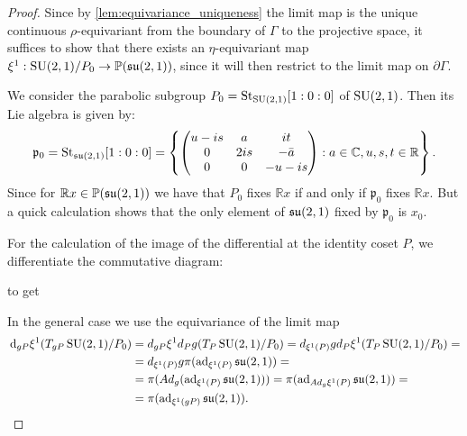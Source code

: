 \documentclass{report}
\begin{document}
\begin{proof}
Since by \cref{lem:equivariance_uniqueness} the limit map is the unique continuous $\rho$-equivariant from the boundary of $\Gamma$ to the projective space, it suffices to show that there exists an $\eta$-equivariant map $\xi^1:\operatorname{{\mathrm{SU}}}(2,1)/P_0 \to \mathbb P(\mathfrak{su}(2,1))$, since it will then restrict to the limit map on $\partial \Gamma$.

We consider the parabolic subgroup $P_0 = \mathrm{St}_{\operatorname{{\mathrm{SU}}}(2,1)} [1:0:0]$ of $\operatorname{{\mathrm{SU}}}(2,1)$.
Then its Lie algebra is given by:
\[
\mathfrak p_0 = \mathrm{St}_{\operatorname{{\mathfrak{su}}}(2,1)}[1:0:0] = \left\{ \begin{pmatrix} u - is & a & i t \\ 0 & 2is & - \bar a \\ 0 & 0 & -u - is \end{pmatrix} : a \in \mathbb C, u,s,t \in \mathbb R \right\}.
\]
Since for $\mathbb R x \in \mathbb P(\operatorname{{\mathfrak{su}}}(2,1))$ we have that $P_0$ fixes $\mathbb R x$ if and only if $\mathfrak p_0$ fixes $\mathbb R x$.
But a quick calculation shows that the only element of $\operatorname{{\mathfrak{su}}}(2,1)$ fixed by $\mathfrak p_0$ is $x_0$.

For the calculation of the image of the differential at the identity coset $P$, we differentiate the commutative diagram:

to get

In the general case we use the equivariance of the limit map
\begin{align*}
    \,\mathrm{d}_{gP} \xi^1 (T_{gP} \operatorname{{\mathrm{SU}}}(2,1)/P_0) &=
    d_{gP} \xi^1 d_P g (T_P \operatorname{{\mathrm{SU}}}(2,1)/P_0) =
    d_{\xi^1(P)} g d_P \xi^1 (T_P \operatorname{{\mathrm{SU}}}(2,1)/P_0) =\\
    &= d_{\xi^1(P)} g \pi(\operatorname{ad}_{\xi^1(P)} \operatorname{{\mathfrak{su}}}(2,1)) =\\
    &= \pi(Ad_g(\operatorname{ad}_{\xi^1(P)} \operatorname{{\mathfrak{su}}}(2,1))) = \pi(\operatorname{ad}_{Ad_g \xi^1(P)} \operatorname{{\mathfrak{su}}}(2,1))=\\
    &= \pi(\operatorname{ad}_{\xi^1(gP)} \operatorname{{\mathfrak{su}}}(2,1)).
\end{align*}
\end{proof}
\end{document}
